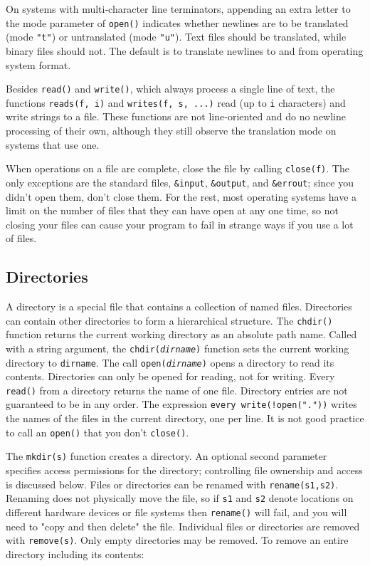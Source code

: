 On systems with multi-character line terminators, appending an
extra letter to the mode parameter of \texttt{open()} indicates whether
newlines are to be translated (mode
\texttt{"t"}) or untranslated (mode
\texttt{"u"}). Text files should
be translated, while binary files should not. The default is to translate
newlines to and from operating system format.

Besides \texttt{read()} and \texttt{write()}, which always process a
single line of text, the functions \texttt{reads(f, i)} and
\texttt{writes(f, s, ...)} read (up to \texttt{i} characters) and write
strings to a file. These functions are not line-oriented and do no
newline processing of their own, although they still observe the
translation mode on systems that use one.

When operations on a file are complete, close the file by calling
\texttt{close(f)}. The only exceptions are the standard
files, \texttt{\&input}, \texttt{\&output}, and \texttt{\&errout};
since you didn't open them, don't
close them. For the rest, most operating systems have a limit on the
number of files that they can have open at any one time, so not closing
your files can cause your program to fail in strange ways if you use a
lot of files.

\subsection*{Directories}

A directory is a special file that contains a
collection of named files. Directories can contain other directories to
form a hierarchical structure. The \texttt{chdir()}
function returns the current working directory as an absolute path
name. Called with a string argument, the
\texttt{chdir(}\texttt{\textit{dirname}}\texttt{)} function sets the
current working directory to \texttt{dirname}. The call
\texttt{open(}\texttt{\textit{dirname}}\texttt{)} opens a directory to
read its contents. Directories can only be opened for reading,
not for writing. Every \texttt{read()} from a directory returns
the name of one file. Directory entries are not guaranteed to be in any
order. The expression \texttt{every
write(!open("."))} writes the names of the
files in the current directory, one per line. It is not good practice
to call an \texttt{open()} that you don't
\texttt{close()}.

The \texttt{mkdir(s)} function creates a directory. An
optional second parameter specifies access permissions for
the directory; controlling file ownership and access is discussed
below. Files or directories can be renamed with \texttt{rename(s1,s2)}.
Renaming does not physically move the file, so if \texttt{s1} and
\texttt{s2} denote locations on different hardware devices or file
systems then \texttt{rename()} will fail, and you will
need to "copy and then delete"
the file. Individual files or directories are removed with
\texttt{remove(s)}. Only empty directories may be
removed. To remove an entire directory including its contents:

